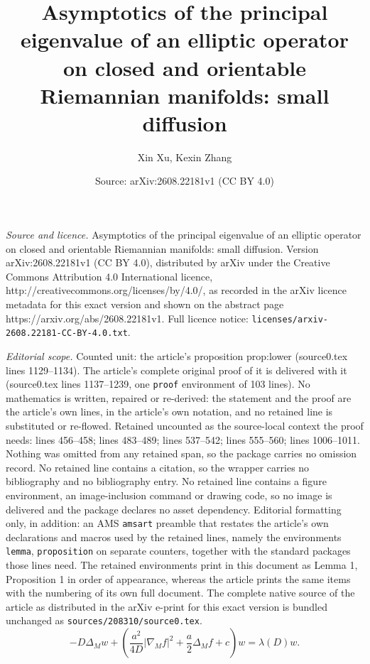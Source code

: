\documentclass[10pt,a4paper]{amsart}
\title{Asymptotics of the principal eigenvalue of an elliptic operator on closed and orientable Riemannian manifolds: small diffusion}
\author{Xin Xu, Kexin Zhang}
\date{Source: arXiv:2608.22181v1 (CC BY 4.0)}
\begin{document}
\maketitle

\noindent\emph{Source and licence.} Asymptotics of the principal eigenvalue of an elliptic operator on closed and orientable Riemannian manifolds: small diffusion. Version arXiv:2608.22181v1 (CC BY 4.0), distributed by arXiv under the Creative Commons Attribution 4.0 International licence, http://creativecommons.org/licenses/by/4.0/, as recorded in the arXiv licence metadata for this exact version and shown on the abstract page https://arxiv.org/abs/2608.22181v1. Full licence notice: \texttt{licenses/arxiv-2608.22181-CC-BY-4.0.txt}.\par\smallskip

\noindent\textit{Editorial scope.} Counted unit: the article's proposition prop:lower (source0.tex lines 1129--1134). The article's complete original proof of it is delivered with it (source0.tex lines 1137--1239, one \texttt{proof} environment of 103 lines). No mathematics is written, repaired or re-derived: the statement and the proof are the article's own lines, in the article's own notation, and no retained line is substituted or re-flowed.  Retained uncounted as the source-local context the proof needs: lines 456--458; lines 483--489; lines 537--542; lines 555--560; lines 1006--1011.  Nothing was omitted from any retained span, so the package carries no omission record.  No retained line contains a citation, so the wrapper carries no bibliography and no bibliography entry.  No retained line contains a figure environment, an image-inclusion command or drawing code, so no image is delivered and the package declares no asset dependency.  Editorial formatting only, in addition: an AMS \texttt{amsart} preamble that restates the article's own declarations and macros used by the retained lines, namely the environments \texttt{lemma}, \texttt{proposition} on separate counters, together with the standard packages those lines need.  The retained environments print in this document as Lemma 1, Proposition 1 in order of appearance, whereas the article prints the same items with the numbering of its own full document.  The complete native source of the article as distributed in the arXiv e-print for this exact version is bundled unchanged as \texttt{sources/208310/source0.tex}.
\begin{equation}\label{Ew}
   -D\Delta_{M}w+\left(\frac{a^2}{4 D}  |\nabla_M f|^2+ \frac{a}{2}\Delta_M f +c\right) w=\lambda(D)w.   
\end{equation}
\end{document}
